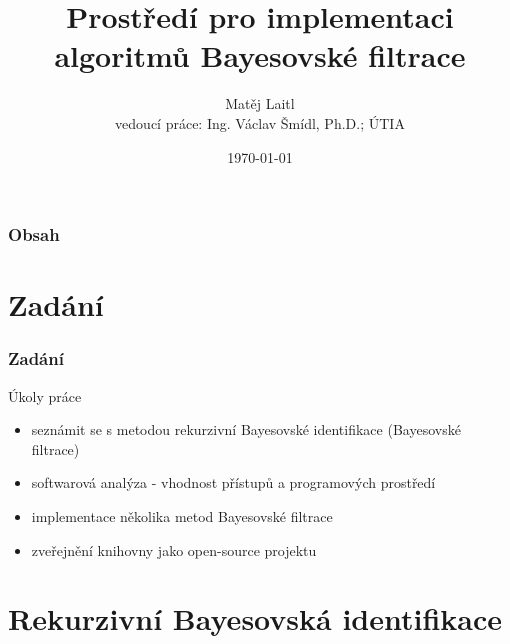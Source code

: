 \documentclass[12pt]{beamer}
\title{Prostředí pro implementaci algoritmů Bayesovské filtrace}
\author[Matěj Laitl]{Matěj Laitl\\ vedoucí práce: Ing. Václav Šmídl, Ph.D.; ÚTIA}
\date{\today}
\begin{document}
\frame{\titlepage}

\section*{}
\begin{frame}
  \frametitle{Obsah}
  \tableofcontents[section=1,hidesubsections]
\end{frame}





\section*{Zadání}

\begin{frame}
	\frametitle{Zadání}

	\begin{block}{Úkoly práce}
		\begin{itemize}
			\item seznámit se s metodou rekurzivní Bayesovské identifikace (Bayesovské filtrace)
			\item softwarová analýza - vhodnost přístupů a programových prostředí
			\item implementace několika metod Bayesovské filtrace
			\item zveřejnění knihovny jako open-source projektu
		\end{itemize}
	\end{block}
\end{frame}

\section{Rekurzivní Bayesovská identifikace}
\end{document}
